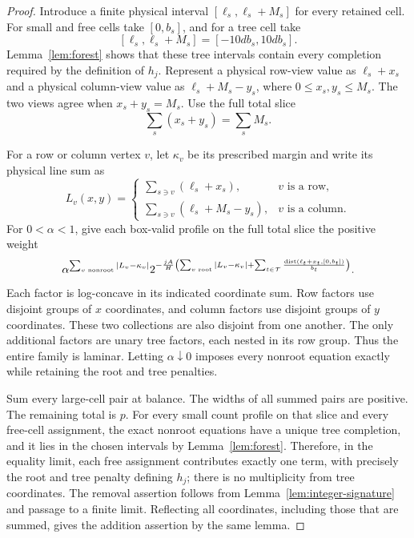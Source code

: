 \begin{proof}
Introduce a finite physical interval
\([\ell_s,\ell_s+M_s]\) for every retained cell.
For small and free cells take \([0,b_s]\), and for a tree cell
take
\[
 [\ell_s,\ell_s+M_s]=[-10db_s,10db_s].
\]
Lemma~\ref{lem:forest} shows that these tree intervals contain
every completion required by the definition of \(h_j\).
Represent a physical row-view value as \(\ell_s+x_s\) and
a physical column-view value as \(\ell_s+M_s-y_s\), where
\(0\le x_s,y_s\le M_s\).
The two views agree when \(x_s+y_s=M_s\).
Use the full total slice
\[
 \sum_s(x_s+y_s)=\sum_sM_s.
\]

For a row or column vertex $v$, let $\kappa_v$ be its prescribed
margin and write its physical line sum as
\[
 L_v(x,y)=
 \begin{cases}
 \sum_{s\ni v}(\ell_s+x_s),&v\text{ is a row},\\
 \sum_{s\ni v}(\ell_s+M_s-y_s),&v\text{ is a column}.
 \end{cases}
\]
For $0<\alpha<1$, give each box-valid profile on the full total
slice the positive weight
\begin{equation}\label{eq:laminar-table-model}
 \alpha^{\sum_{v\text{ nonroot}}|L_v-\kappa_v|}
 2^{-\frac{jA}{H}\left(
   \sum_{v\text{ root}}|L_v-\kappa_v|
   +\sum_{t\in\mathcal T}
      \frac{\operatorname{dist}(\ell_t+x_t,[0,b_t])}{b_t}\right)}.
\end{equation}
Each factor is log-concave in its indicated coordinate sum.
Row factors use disjoint groups of $x$ coordinates, and column factors
use disjoint groups of $y$ coordinates.  These two collections are also
disjoint from one another.  The only additional factors are unary tree
factors, each nested in its row group.  Thus the entire family is
laminar.  Letting $\alpha\downarrow0$ imposes every nonroot equation
exactly while retaining the root and tree penalties.

Sum every large-cell pair at balance.
The widths of all summed pairs are positive.
The remaining total is \(p\).
For every small count profile on that slice and every free-cell
assignment, the exact nonroot equations have a unique tree
completion, and it lies in the chosen intervals by
Lemma~\ref{lem:forest}.
Therefore, in the equality limit, each free assignment contributes
exactly one term, with precisely the root and tree penalty defining
\(h_j\); there is no multiplicity from tree coordinates.
The removal assertion follows from
Lemma~\ref{lem:integer-signature} and passage to a finite limit.
Reflecting all coordinates, including those that are summed, gives
the addition assertion by the same lemma.
\end{proof}

